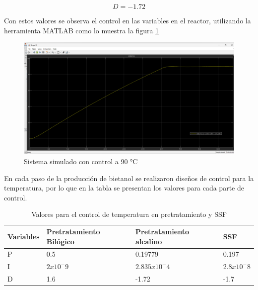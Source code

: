\documentclass[12pt]{article}
\begin{document}
	\begin{equation}
		D=-1.72
	\end{equation}
	
	Con estos valores se observa el control en las variables en el reactor, utilizando la herramienta MATLAB como lo muestra la figura \ref{sistema simulado}
	
	\begin{figure}[H]
		\centering
		\includegraphics[width=0.8\linewidth]{imagenes/sistema_controlado}
		\caption{Sistema simulado con control a 90 °C}
		\label{sistema simulado}
	\end{figure}
	
  En cada paso de la producción de bietanol se realizaron diseños de control para la temperatura, por lo que en la tabla se presentan los valores para cada parte de control.
	 
	
	
	\begin{table}[H]
		\centering
		\caption{Valores para el control de temperatura en pretratamiento y SSF}
		\begin{tabular}{|l|l|l|l|}
			\hline
			Variables & Pretratamiento Bilógico & Pretratamiento alcalino & SSF \\ \hline
			P & 0.5 & 0.19779 & 0.197 \\ \hline
	    	I & $2 x10^-9 $ & $2.835 x10^-4 $ & $2.8 x10^-8 $ \\ \hline
			D & 1.6 & -1.72 & -1.7 \\ \hline
\end{tabular}
\label{tabla_control}
\end{table}
	
	
	
	
	
	
\end{document}
